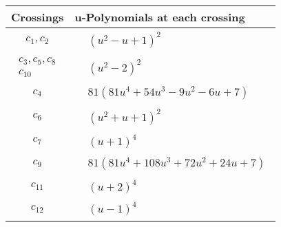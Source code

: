 \documentclass[1p]{elsarticle_modified}
\theoremstyle{definition}
\begin{document}
\begin{tabular}{m{50pt}|m{274pt}}
Crossings & \hspace{64pt}u-Polynomials at each crossing \\
\hline $$\begin{aligned}c_{1},c_{2}\end{aligned}$$&$\begin{aligned}
&(u^2- u+1)^2
\end{aligned}$\\
\hline $$\begin{aligned}c_{3},c_{5},c_{8}\\c_{10}\end{aligned}$$&$\begin{aligned}
&(u^2-2)^2
\end{aligned}$\\
\hline $$\begin{aligned}c_{4}\end{aligned}$$&$\begin{aligned}
&81(81 u^4+54 u^3-9 u^2-6 u+7)
\end{aligned}$\\
\hline $$\begin{aligned}c_{6}\end{aligned}$$&$\begin{aligned}
&(u^2+u+1)^2
\end{aligned}$\\
\hline $$\begin{aligned}c_{7}\end{aligned}$$&$\begin{aligned}
&(u+1)^4
\end{aligned}$\\
\hline $$\begin{aligned}c_{9}\end{aligned}$$&$\begin{aligned}
&81(81 u^4+108 u^3+72 u^2+24 u+7)
\end{aligned}$\\
\hline $$\begin{aligned}c_{11}\end{aligned}$$&$\begin{aligned}
&(u+2)^4
\end{aligned}$\\
\hline $$\begin{aligned}c_{12}\end{aligned}$$&$\begin{aligned}
&(u-1)^4
\end{aligned}$\\
\hline
\end{tabular}\\~\\
\end{document}
